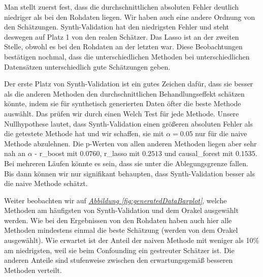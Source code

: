 \documentclass[12pt,a4paper,twoside]{scrartcl}
\numberwithin{equation}{section}
\newcommand{\reffig}[1]{\emph{\hyperref[#1]{Abbildung \ref*{#1}}}}
\begin{document}
\noindent
Man stellt zuerst fest, dass die durchschnittlichen absoluten Fehler deutlich niedriger als bei den Rohdaten liegen. Wir haben auch eine andere Ordnung von den Schätzungen. Synth-Validation hat den niedrigsten Fehler und steht deswegen auf Platz 1 von den realen Schätzer. Das Lasso ist an der zweiten Stelle, obwohl es bei den Rohdaten an der letzten war. Diese Beobachtungen bestätigen nochmal, dass die unterschiedlichen Methoden bei unterschiedlichen Datensätzen unterschiedlich gute Schätzungen geben.\par

\noindent
Der erste Platz von Synth-Validation ist ein gutes Zeichen dafür, dass sie besser als die anderen Methoden den durchschnittlichen Behandlungseffekt schätzen könnte, indem sie für synthetisch generierten Daten öfter die beste Methode auswählt. Das prüfen wir durch einen Welch Test für jede Methode. Unsere Nullhypothese lautet, dass Synth-Validation einen größeren absoluten Fehler als die getestete Methode hat und wir schaffen, sie  mit $\alpha = 0.05$ nur für die naive Methode abzulehnen. Die p-Werten von allen anderen Methoden liegen aber sehr nah an $\alpha$ - r\_boost mit $0.0760$, r\_lasso mit $0.2513$ und causal\_forest mit $0.1535$. Bei mehreren Läufen könnte es sein, dass sie unter die Ablegungsgrenze fallen. Bis dann können wir nur signifikant behaupten, dass Synth-Validation besser als die naive Methode schätzt.\par

\noindent
Weiter beobachten wir auf \reffig{fig:generatedDataBarplot}, welche Methoden am häufigsten von Synth-Validation und dem Orakel ausgewählt werden. Wie bei den Ergebnissen von den Rohdaten haben auch hier alle Methoden mindestens einmal die beste Schätzung (werden von dem Orakel ausgewählt). Wie erwartet ist der Anteil der naiven Methode mit weniger als 10\% am niedrigsten, weil sie beim Confounding ein gestreuter Schätzer ist. Die anderen Anteile sind stufenweise zwischen den erwartungsgemäß besseren Methoden verteilt.\par 
\end{document}
